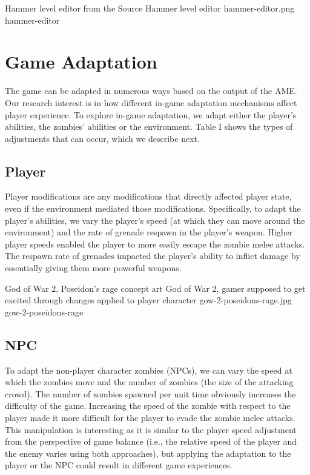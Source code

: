 \largeimg
{Hammer level editor from the Source}
{Hammer level editor}
{hammer-editor.png}
{hammer-editor}

\section{Game Adaptation}
The game can be adapted in numerous ways based on the output of the AME. Our research interest is in how different in-game adaptation mechanisms affect player experience. To explore in-game adaptation, we adapt either the player's abilities, the zombies' abilities or the environment. Table I shows the types of adjustments that can occur, which we describe next.

\subsection{Player}
Player modifications are any modifications that directly affected player state, even if the environment mediated those modifications. Specifically, to adapt the player's abilities, we vary the player's speed (at which they can move around the environment) and the rate of grenade respawn in the player's weapon. Higher player speeds enabled the player to more easily escape the zombie melee attacks. The respawn rate of grenades impacted the player's ability to inflict damage by essentially giving them more powerful weapons.

\largeimg
{God of War 2, Poseidon's rage concept art}
{God of War 2, gamer supposed to get excited through changes applied to player character}
{gow-2-poseidons-rage.jpg}
{gow-2-poseidons-rage}

\subsection{NPC}
To adapt the non-player character zombies (NPCs), we can vary the speed at which the zombies move and the number of zombies (the size of the attacking crowd). The number of zombies spawned per unit time obviously increases the difficulty of the game. Increasing the speed of the zombie with respect to the player made it more difficult for the player to evade the zombie melee attacks. This manipulation is interesting as it is similar to the player speed adjustment from the perspective of game balance (i.e., the relative speed of the player and the enemy varies using both approaches), but applying the adaptation to the player or the NPC could result in different game experiences.

